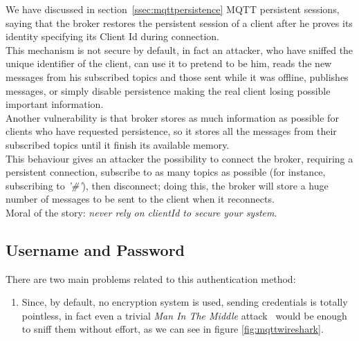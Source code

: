\documentclass[12pt]{report}
\begin{document}
{{We have discussed in section~\ref{ssec:mqttpersistence} MQTT persistent sessions, saying that the broker restores the persistent session of a client after he proves its identity specifying its Client Id during connection.\\
This mechanism is not secure by default, in fact an attacker, who have sniffed the unique identifier of the client, can use it to pretend to be him, reads the new messages from his subscribed topics and those sent while it was offline, publishes messages, or simply disable persistence making the real client losing possible important information.\\
Another vulnerability is that broker stores as much information as possible for clients who have requested persistence, so it stores all the messages from their subscribed topics until it finish its available memory.\\
This behaviour gives an attacker the possibility to connect the broker, requiring a persistent connection, subscribe to as many topics as possible (for instance, subscribing to \emph{'\#'}), then disconnect; doing this, the broker will store a huge number of messages to be sent to the client when it reconnects.\\

Moral of the story: \emph{never rely on clientId to secure your system}.\\

\subsection{Username and Password}
\bigskip
There are two main problems related to this authentication method:

\begin{enumerate}
\setlength{\itemindent}{+4mm}
  \item Since, by default, no encryption system is used, sending credentials is totally pointless, in fact even a trivial \emph{Man In The Middle} attack~\cite{mitmwiki} would be enough to sniff them without effort, as we can see in figure \ref{fig:mqttwireshark}.


\end{enumerate}}}
\end{document}
